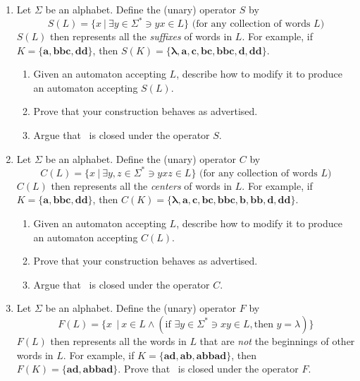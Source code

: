 \begin{enumerate}[{5.}1. ]
\item Let $\Sigma$ be an alphabet. Define the (unary) operator $S$ by
\[ S(L)=\{x\ | \ \exists y \in \Sigma^* \ni yx \in L\}\text{ (for any collection of
words $L$)} \]
$S(L)$ then represents all the \emph{suffixes} of words in $L$. For example, if
$K=\{\pmb{a},\pmb{bbc},\pmb{dd}\}$, then
$S(K)=\{\pmb{\lambda},\pmb{a},\pmb{c},\pmb{bc},\pmb{bbc},\pmb{d},\pmb{dd}\}$.
\begin{enumerate}
\item Given an automaton accepting $L$, describe how to modify it to produce an
automaton accepting $S(L)$.
\item Prove that your construction behaves as advertised.
\item Argue that \DSIG\ is closed under the operator $S$.
\end{enumerate}

\item Let $\Sigma$ be an alphabet. Define the (unary) operator $C$ by
\[ C(L)=\{x\ | \ \exists y,z \in \Sigma^* \ni yxz \in L\}
	\text{ (for any collection of words $L$)} \]
$C(L)$ then represents all the \emph{centers} of words in $L$. For example, if
$K=\{\pmb{a},\pmb{bbc},\pmb{dd}\}$, then $C(K)=\{\pmb{\lambda},\pmb{a},\pmb{c},
\pmb{bc},\pmb{bbc},\pmb{b},\pmb{bb},\pmb{d},\pmb{dd}\}$.
\begin{enumerate}
\item Given an automaton accepting $L$, describe how to modify it to produce an
automaton accepting $C(L)$.
\item Prove that your construction behaves as advertised.
\item Argue that \DSIG\ is closed under the operator $C$.
\end{enumerate}

\item Let $\Sigma$ be an alphabet. Define the (unary) operator $F$ by
\[ F(L)=\{x\ \ | \ x \in L \wedge (\text{if }\exists y \in \Sigma^* \ni xy \in L,
	\text{then }y = \lambda)\} \]
$F(L)$ then represents all the words in $L$ that are \emph{not} the beginnings of
other words in $L$. For example, if $K=\{\pmb{ad},\pmb{ab},\pmb{abbad}\}$, then
$F(K)=\{\pmb{ad},\pmb{abbad}\}$. Prove that \DSIG\ is closed under the operator
$F$.


\end{enumerate}

